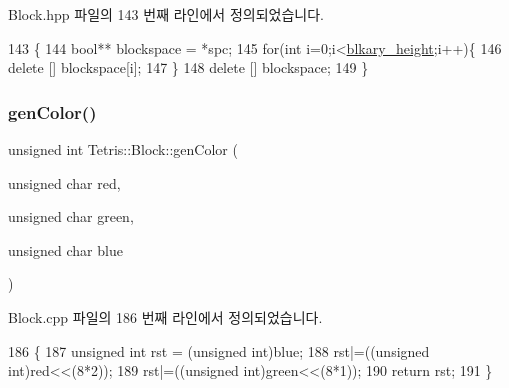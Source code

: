 Block.\+hpp 파일의 143 번째 라인에서 정의되었습니다.


\begin{DoxyCode}
143                                             \{
144                 \textcolor{keywordtype}{bool}** blockspace = *spc;
145                 \textcolor{keywordflow}{for}(\textcolor{keywordtype}{int} i=0;i<\hyperlink{class_tetris_1_1_block_abbea7737c2b1fb7339aab4dff13de27c}{blkary\_height};i++)\{
146                     \textcolor{keyword}{delete} [] blockspace[i];
147                 \}
148                 \textcolor{keyword}{delete} [] blockspace;
149             \}
\end{DoxyCode}
\mbox{\label{class_tetris_1_1_block_a7362b9c1679a87823590a3c20ca53a55}} 
\subsubsection{\texorpdfstring{gen\+Color()}{genColor()}}
{\footnotesize\ttfamily unsigned int Tetris\+::\+Block\+::gen\+Color (\begin{DoxyParamCaption}\item[{unsigned char}]{red,  }\item[{unsigned char}]{green,  }\item[{unsigned char}]{blue }\end{DoxyParamCaption})\hspace{0.3cm}{\ttfamily [private]}}



Block.\+cpp 파일의 186 번째 라인에서 정의되었습니다.


\begin{DoxyCode}
186                                                                                      \{
187                 \textcolor{keywordtype}{unsigned} \textcolor{keywordtype}{int} rst = (\textcolor{keywordtype}{unsigned} int)blue;
188                 rst|=((\textcolor{keywordtype}{unsigned} int)red<<(8*2));
189                 rst|=((\textcolor{keywordtype}{unsigned} int)green<<(8*1));
190                 \textcolor{keywordflow}{return} rst;
191             \}
\end{DoxyCode}
\mbox{\label{class_tetris_1_1_block_a4bae85cab786853cb3ff76aa7fe72edc}} 
